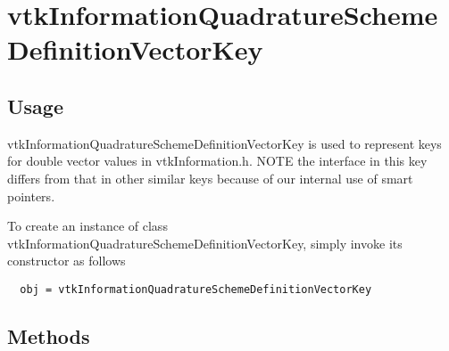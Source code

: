 \section{vtkInformationQuadratureSchemeDefinitionVectorKey}

\subsection{Usage}

 vtkInformationQuadratureSchemeDefinitionVectorKey is used to represent keys for double
 vector values in vtkInformation.h. NOTE the interface in this key differs
 from that in other similar keys because of our internal use of smart
 pointers.

To create an instance of class vtkInformationQuadratureSchemeDefinitionVectorKey, simply
invoke its constructor as follows
\begin{verbatim}
  obj = vtkInformationQuadratureSchemeDefinitionVectorKey
\end{verbatim}
\subsection{Methods}

